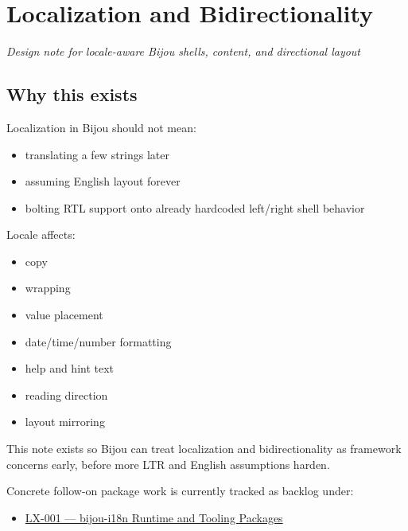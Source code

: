 \chapter{Localization and Bidirectionality}\label{record-051}

\smallskip

\emph{Design note for locale-aware Bijou shells, content, and directional layout}

\section{Why this exists}\label{record-051-why-this-exists}

Localization in Bijou should not mean:

\begin{itemize}
\tightlist
\item
  translating a few strings later
\item
  assuming English layout forever
\item
  bolting RTL support onto already hardcoded left/right shell behavior
\end{itemize}

Locale affects:

\begin{itemize}
\tightlist
\item
  copy
\item
  wrapping
\item
  value placement
\item
  date/time/number formatting
\item
  help and hint text
\item
  reading direction
\item
  layout mirroring
\end{itemize}

This note exists so Bijou can treat localization and bidirectionality as framework concerns early, before more LTR and English assumptions harden.

Concrete follow-on package work is currently tracked as backlog under:

\begin{itemize}
\tightlist
\item
  \href{https://github.com/flyingrobots/bijou/blob/cbd70612140e7a450d764b3c7be1c6af878b99bc/docs/design/LX-001-bijou-i18n-runtime-package.md}{LX-001 --- bijou-i18n Runtime and Tooling Packages}
\end{itemize}

